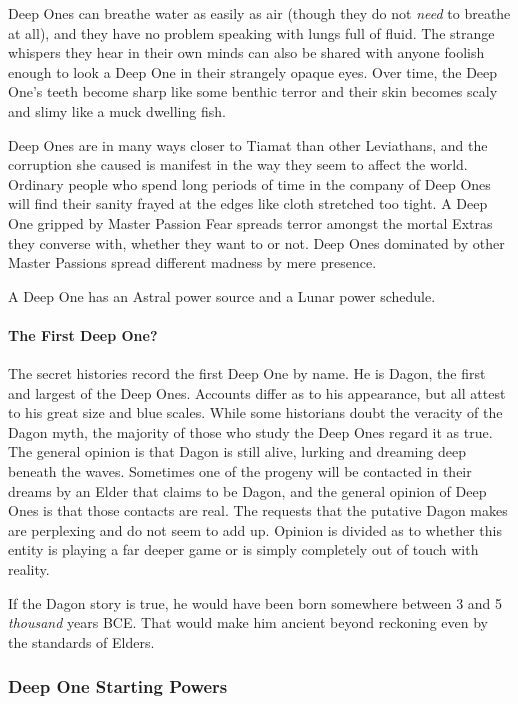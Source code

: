 Deep Ones can breathe water as easily as air (though they do not \textit{need} to breathe at all), and they have no problem speaking with lungs full of fluid. The strange whispers they hear in their own minds can also be shared with anyone foolish enough to look a Deep One in their strangely opaque eyes. Over time, the Deep One's teeth become sharp like some benthic terror and their skin becomes scaly and slimy like a muck dwelling fish. 

Deep Ones are in many ways closer to Tiamat than other Leviathans, and the corruption she caused is manifest in the way they seem to affect the world. Ordinary people who spend long periods of time in the company of Deep Ones will find their sanity frayed at the edges like cloth stretched too tight. A Deep One gripped by Master Passion Fear spreads terror amongst the mortal Extras they converse with, whether they want to or not. Deep Ones dominated by other Master Passions spread different madness by mere presence.

A Deep One has an Astral power source and a Lunar power schedule.

\paragraph{The First Deep One?} The secret histories record the first Deep One by name. He is Dagon, the first and largest of the Deep Ones. Accounts differ as to his appearance, but all attest to his great size and blue scales. While some historians doubt the veracity of the Dagon myth, the majority of those who study the Deep Ones regard it as true. The general opinion is that Dagon is still alive, lurking and dreaming deep beneath the waves. Sometimes one of the progeny will be contacted in their dreams by an Elder that claims to be Dagon, and the general opinion of Deep Ones is that those contacts are real. The requests that the putative Dagon makes are perplexing and do not seem to add up. Opinion is divided as to whether this entity is playing a far deeper game or is simply completely out of touch with reality.

If the Dagon story is true, he would have been born somewhere between 3 and 5 \textit{thousand} years BCE. That would make him ancient beyond reckoning even by the standards of Elders.

\subsubsection{Deep One Starting Powers}


